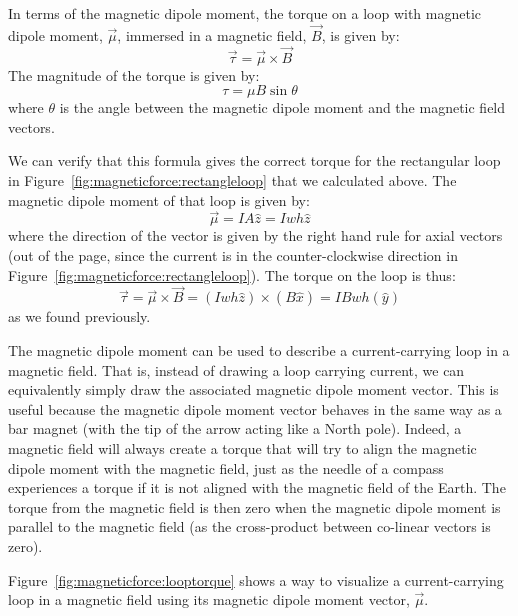 In terms of the magnetic dipole moment, the torque on a loop with magnetic dipole moment, $\vec \mu$, immersed in a magnetic field, $\vec B$, is given by:
\begin{equation}
\boxed{\vec \tau = \vec \mu \times \vec B}
\end{equation}
The magnitude of the torque is given by:
\begin{equation}
\tau =\mu B \sin\theta
\end{equation}
where $\theta$ is the angle between the magnetic dipole moment and the magnetic field vectors.

We can verify that this formula gives the correct torque for the rectangular loop in Figure~\ref{fig:magneticforce:rectangleloop} that we calculated above. The magnetic dipole moment of that loop is given by:
\begin{equation}
\vec \mu = IA \hat z = Iwh\hat z
\end{equation}
where the direction of the vector is given by the right hand rule for axial vectors (out of the page, since the current is in the counter-clockwise direction in Figure~\ref{fig:magneticforce:rectangleloop}). The torque on the loop is thus:
\begin{equation}
\vec \tau = \vec \mu \times \vec B = (Iwh\hat z) \times (B\hat x) = IBwh (\hat y)
\end{equation}
as we found previously.

The magnetic dipole moment can be used to describe a current-carrying loop in a magnetic field. That is, instead of drawing a loop carrying current, we can equivalently simply draw the associated magnetic dipole moment vector. This is useful because the magnetic dipole moment vector behaves in the same way as a bar magnet (with the tip of the arrow acting like a North pole). Indeed, a magnetic field will always create a torque that will try to align the magnetic dipole moment with the magnetic field, just as the needle of a compass experiences a torque if it is not aligned with the magnetic field of the Earth. The torque from the magnetic field is then zero when the magnetic dipole moment is parallel to the magnetic field (as the cross-product between co-linear vectors is zero).

Figure~\ref{fig:magneticforce:looptorque} shows a way to visualize a current-carrying loop in a magnetic field using its magnetic dipole moment vector, $\vec \mu$.

